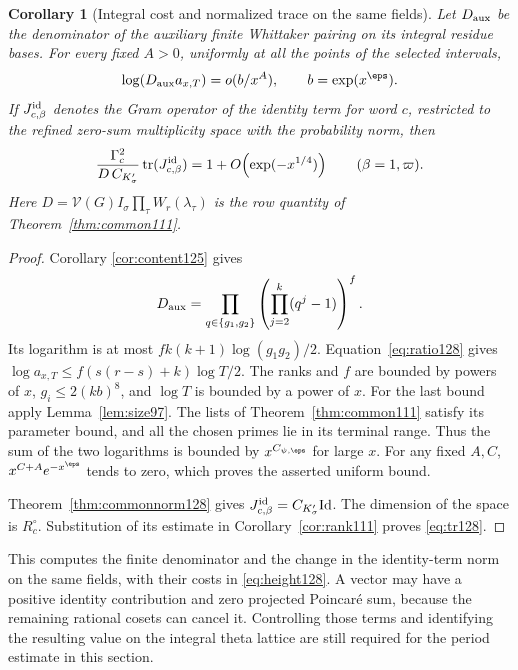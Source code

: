 \documentclass[a4paper,11pt]{article}
\newtheorem{corollary}[proposition]{Corollary}
\theoremstyle{definition}
\theoremstyle{remark}
\numberwithin{equation}{section}
\begin{document}
\begin{corollary}[Integral cost and normalized trace on the same fields]
\label{cor:cost128}
Let \(D_{\rm aux}\) be the denominator of the auxiliary finite
Whittaker pairing on its integral residue bases. For every fixed
\(A>0\), uniformly at all the points of the selected intervals,
\begin{equation}
 \log(D_{\rm aux}a_{x,T})=o(b/x^A),\qquad b=\exp(x^\eps).
 \label{eq:height128}
\end{equation}
If \(J^{\rm id}_{c,\beta}\) denotes the Gram operator of the
identity term for word \(c\), restricted to the refined zero-sum
multiplicity space with the probability norm, then
\begin{equation}
 \frac{\Gamma_c^2}{D\,C_{K_\sigma'}}
           \operatorname{tr}(J^{\rm id}_{c,\beta})
    =1+O\!\left(\exp(-x^{1/4})\right)
           \qquad(\beta=1,\varpi).
 \label{eq:tr128}
\end{equation}
Here \(D=\mathcal V(G)I_\sigma\prod_\tau W_r(\lambda_\tau)\)
is the row quantity of Theorem~\ref{thm:common111}.
\end{corollary}
\begin{proof}
Corollary \ref{cor:content125} gives
\[
 D_{\rm aux}=\prod_{q\in\{g_1,g_2\}}
                  \left(\prod_{j=2}^{k}(q^j-1)\right)^f .
\]
Its logarithm is at most \(fk(k+1)\log(g_1g_2)/2\).
Equation~\eqref{eq:ratio128} gives
\(\log a_{x,T}\le f(s(r-s)+k)\log T/2\).
The ranks and \(f\) are bounded by powers of \(x\),
\(g_i\le2(kb)^8\), and \(\log T\) is bounded by a power of \(x\).
For the last bound apply Lemma~\ref{lem:size97}. The lists of
Theorem~\ref{thm:common111} satisfy its parameter bound, and all
the chosen primes lie in its terminal range. Thus the sum of the
two logarithms is bounded by \(x^{C_{\psi,\eps}}\) for large \(x\).
For any fixed \(A,C\), \(x^{C+A}e^{-x^\eps}\) tends to zero,
which proves the asserted uniform bound.

Theorem~\ref{thm:commonnorm128} gives
\(J^{\rm id}_{c,\beta}=C_{K_\sigma'}\mathrm{Id}\).
The dimension of the space is \(R_c^\circ\).
Substitution of its estimate in Corollary~\ref{cor:rank111}
proves \eqref{eq:tr128}.
\end{proof}

This computes the finite denominator and the change in the
identity-term norm on the same fields, with their costs in
\eqref{eq:height128}. A vector may have a positive identity
contribution and zero projected Poincar\'e sum, because the
remaining rational cosets can cancel it. Controlling those terms
and identifying the resulting value on the integral theta lattice
are still required for the period estimate in this section.
\end{document}

